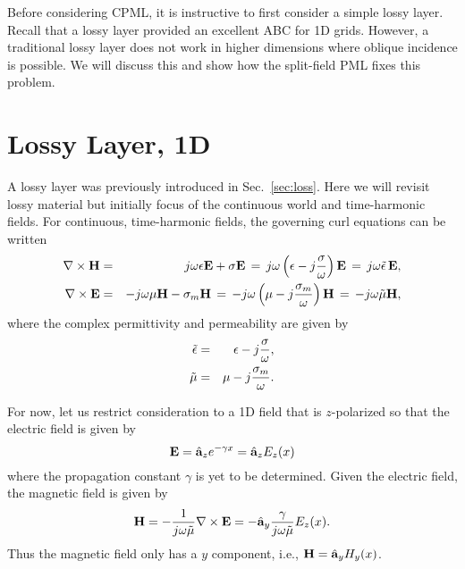 Before considering CPML, it is instructive to first consider a simple
lossy layer.  Recall that a lossy layer provided an excellent
ABC for 1D grids.  However, a traditional lossy layer does not work in
higher dimensions where oblique incidence is possible.  We will
discuss this and show how the split-field PML fixes this problem.

\section{Lossy Layer, 1D}

A lossy layer was previously introduced in Sec.\ \ref{sec:loss}.  Here
we will revisit lossy material but initially focus of the continuous
world and time-harmonic fields.  For continuous, time-harmonic fields,
the governing curl equations can be written
\begin{eqnarray}
  \nabla\times\mathbf{H} &=&
    j\omega\epsilon\mathbf{E} + \sigma\mathbf{E} \,=\,
    j\omega\left(\epsilon - j\frac{\sigma}{\omega}\right)\mathbf{E} \,=\,
    j\omega\tilde{\epsilon}\,\mathbf{E}, \\
  \nabla\times\mathbf{E} &=&
    -j\omega\mu\mathbf{H} - \sigma_m\mathbf{H} \,=\,
    -j\omega\left(\mu - j\frac{\sigma_m}{\omega}\right)\mathbf{H} \,=\,
    -j\omega\tilde{\mu}\mathbf{H},
\end{eqnarray}
where the complex permittivity and permeability are given by
\begin{eqnarray}
  \tilde{\epsilon} &=& \epsilon - j\frac{\sigma}{\omega}, \\
  \tilde{\mu} &=& \mu - j\frac{\sigma_m}{\omega}.
\end{eqnarray}

For now, let us restrict consideration to a 1D field that is
$z$-polarized so that the electric field is given by
\begin{equation}
  \mathbf{E} = \hat{\mathbf{a}}_{z} e^{-\gamma x} = \hat{\mathbf{a}}_{z} E_z(x)
\end{equation}
where the propagation constant $\gamma$ is yet to be determined.
Given the electric field, the magnetic field is given by
\begin{equation}
  \mathbf{H} = -\frac{1}{j\omega\tilde{\mu}} \nabla\times\mathbf{E}
        = -\hat{\mathbf{a}}_{y}\frac{\gamma}{j\omega\tilde{\mu}} E_z(x).
\end{equation}
Thus the magnetic field only has a $y$ component, i.e.,
$\mathbf{H}=\hat{\mathbf{a}}_{y}H_y(x)$.

